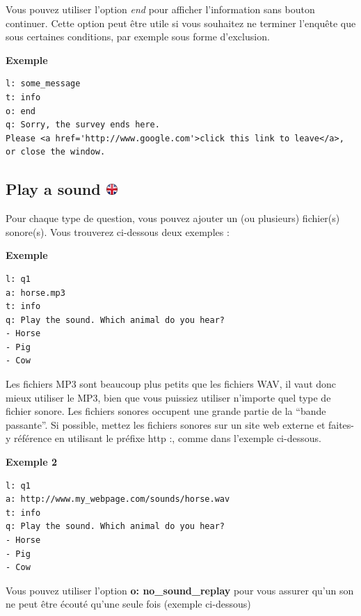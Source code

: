 \documentclass[
]{book}
\begin{document}
Vous pouvez utiliser l'option \emph{end} pour afficher l'information sans bouton continuer. Cette option peut être utile si vous souhaitez ne terminer l'enquête que sous certaines conditions, par exemple sous forme d'exclusion.

\textbf{Exemple}

\begin{verbatim}
l: some_message
t: info
o: end
q: Sorry, the survey ends here.
Please <a href='http://www.google.com'>click this link to leave</a>, or close the window.
\end{verbatim}

\hypertarget{play-a-sound}{%
\subsection[Play a sound ]{\texorpdfstring{Play a sound \href{https://www.psytoolkit.org/doc3.4.0/online-survey-syntax.html\#sound}{\protect\includegraphics{img/ukflag.png}}}{Play a sound }}\label{play-a-sound}}

Pour chaque type de question, vous pouvez ajouter un (ou plusieurs) fichier(s) sonore(s). Vous trouverez ci-dessous deux exemples :

\textbf{Exemple}

\begin{verbatim}
l: q1
a: horse.mp3
t: info
q: Play the sound. Which animal do you hear?
- Horse
- Pig
- Cow
\end{verbatim}

Les fichiers MP3 sont beaucoup plus petits que les fichiers WAV, il vaut donc mieux utiliser le MP3, bien que vous puissiez utiliser n'importe quel type de fichier sonore. Les fichiers sonores occupent une grande partie de la ``bande passante''. Si possible, mettez les fichiers sonores sur un site web externe et faites-y référence en utilisant le préfixe http :, comme dans l'exemple ci-dessous.

\textbf{Exemple 2}

\begin{verbatim}
l: q1
a: http://www.my_webpage.com/sounds/horse.wav
t: info
q: Play the sound. Which animal do you hear?
- Horse
- Pig
- Cow
\end{verbatim}

Vous pouvez utiliser l'option \textbf{o: no\_sound\_replay} pour vous assurer qu'un son ne peut être écouté qu'une seule fois (exemple ci-dessous)
\end{document}
